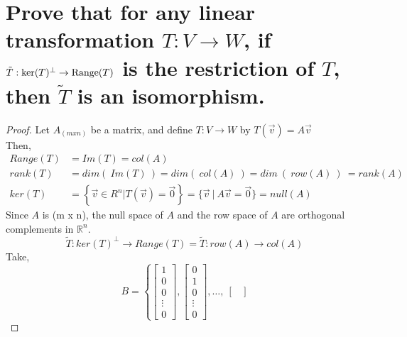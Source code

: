\documentclass[../main.tex]{subfiles}
\begin{document}
\section[Bonus Problem]{Prove that for any linear transformation $T:V \to W$, if $\tilde{T}: {\rm ker}(T)^{\perp} \to {\rm Range}(T)$ is the restriction of $T$, then $\tilde{T}$ is an isomorphism. }
\begin{proof}
        Let $\displaystyle A_{( mxn)}$ be a matrix, and define $\displaystyle T:V\rightarrow W$ by $\displaystyle T(\vec{v}) =A\vec{v}$\\
        Then,
        \begin{align*}
                Range( T) & =Im( T) =col( A)                                                                                     \\
                rank( T)  & =dim( \ Im( T) \ ) =dim( \ col( A) \ ) =dim\ ( \ row( A) \ ) \ =rank( A)                             \\
                ker( T)   & =\left\{\vec{v} \in R^{n} |T(\vec{v}) =\vec{0}\right\} =\{\vec{v} \ |\ A\vec{v} =\vec{0}\} =null( A)
        \end{align*}
        Since $\displaystyle A$ is (m x n), the null space of $\displaystyle A$ and the row space of $\displaystyle A$ are orthogonal complements in $\displaystyle \mathbb{R}^{n}$.
        \begin{equation*}
                \tilde{T} :ker( T)^{\perp }\rightarrow Range( T) =\tilde{T} :row( A)\rightarrow col( A)
        \end{equation*}
        Take,
        \begin{equation*}
                B=\left\{\begin{bmatrix}
                        1      \\
                        0      \\
                        0      \\
                        \vdots \\
                        0
                \end{bmatrix} ,\begin{bmatrix}
                        0      \\
                        1      \\
                        0      \\
                        \vdots \\
                        0
                \end{bmatrix} ,\dotsc ,\ \begin{bmatrix}

\end{bmatrix}
\end{equation*}
\end{proof}
\end{document}
